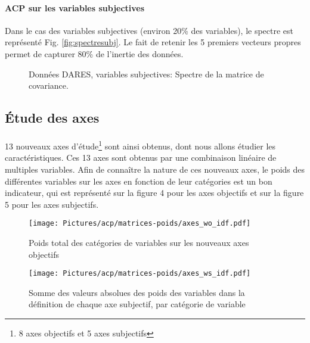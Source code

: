 \documentclass[11pt,fleqn,a4paper,openany,frenchb]{book} %
\begin{document}
\paragraph{ACP sur les variables subjectives\\}
Dans le cas des variables subjectives (environ 20\% des variables), le spectre est représenté Fig. \ref{fig:spectresubj}. Le fait de retenir les 5 premiers vecteurs propres permet de capturer 80\% de l'inertie des données.

\begin{figure}[!h]
    \centering
  \hspace{2pt}
  \caption{Données DARES, variables subjectives: Spectre de la matrice de covariance.}
\end{figure}

\subsection{\'Etude des axes }
\paragraph{}
13 nouveaux axes d'étude\footnote{8 axes objectifs et 5 axes subjectifs} sont ainsi obtenus, dont nous allons étudier les caractéristiques. Ces 13 axes sont obtenus par une combinaison linéaire de multiples variables. Afin de connaître la nature de ces nouveaux axes, le poids des différentes variables sur les axes en fonction de leur catégories est un bon indicateur, qui est représenté sur la figure 4 pour les axes objectifs et sur la figure 5 pour les axes subjectifs. 
\begin{figure}[!h]
    \centering
  \texttt{[image: Pictures/acp/matrices-poids/axes\_wo\_idf.pdf]}
    \caption{Poids total des catégories de variables sur les nouveaux axes objectifs}
    \label{fig:ACPobj}
\end{figure}


\begin{figure}[!h]
  \centering
  \texttt{[image: Pictures/acp/matrices-poids/axes\_ws\_idf.pdf]}
  \caption{Somme des valeurs absolues des poids des variables dans la définition de chaque axe subjectif, par catégorie de variable}
  \label{fig:ACPsubj}
\end{figure}
\end{document}
